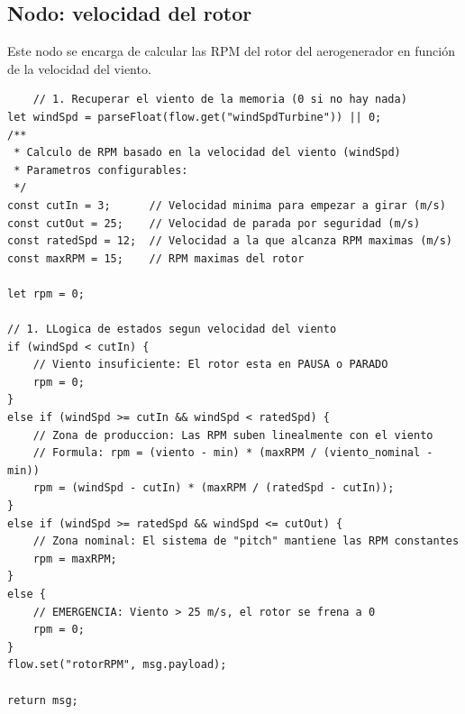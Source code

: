 \subsection{Nodo: velocidad del rotor}
Este nodo se encarga de calcular las RPM del rotor del aerogenerador en función de la velocidad del viento.
\begin{lstlisting}
    // 1. Recuperar el viento de la memoria (0 si no hay nada)
let windSpd = parseFloat(flow.get("windSpdTurbine")) || 0;
/**
 * Calculo de RPM basado en la velocidad del viento (windSpd)
 * Parametros configurables:
 */
const cutIn = 3;      // Velocidad minima para empezar a girar (m/s)
const cutOut = 25;    // Velocidad de parada por seguridad (m/s)
const ratedSpd = 12;  // Velocidad a la que alcanza RPM maximas (m/s)
const maxRPM = 15;    // RPM maximas del rotor

let rpm = 0;

// 1. LLogica de estados segun velocidad del viento
if (windSpd < cutIn) {
    // Viento insuficiente: El rotor esta en PAUSA o PARADO
    rpm = 0;
} 
else if (windSpd >= cutIn && windSpd < ratedSpd) {
    // Zona de produccion: Las RPM suben linealmente con el viento
    // Formula: rpm = (viento - min) * (maxRPM / (viento_nominal - min))
    rpm = (windSpd - cutIn) * (maxRPM / (ratedSpd - cutIn));
} 
else if (windSpd >= ratedSpd && windSpd <= cutOut) {
    // Zona nominal: El sistema de "pitch" mantiene las RPM constantes
    rpm = maxRPM;
} 
else {
    // EMERGENCIA: Viento > 25 m/s, el rotor se frena a 0
    rpm = 0;
}
flow.set("rotorRPM", msg.payload);

return msg;
\end{lstlisting}
\vspace{1cm}


